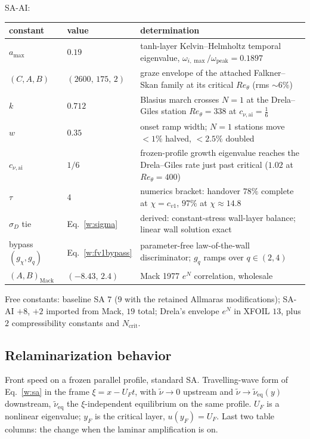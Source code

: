 \documentclass[10pt]{article}
\begin{document}
SA-AI:
\begin{table}[H]\centering\small
\begin{tabular}{llp{3.9in}}
\toprule
constant & value & determination \\
\midrule
$a_{\max}$ & $0.19$ & tanh-layer Kelvin--Helmholtz temporal eigenvalue, $\omega_{i,\max}/\omega_{\mathrm{peak}}=0.1897$ \\
$(C,A,B)$ & $(2600,\,175,\,2)$ & graze envelope of the attached Falkner--Skan family at its critical $Re_\theta$ (rms $\sim6\%$) \\
$k$ & $0.712$ & Blasius march crosses $N\!=\!1$ at the Drela--Giles station $Re_\theta=338$ at $c_{\nu,\mathrm{ai}}=\tfrac16$ \\
$w$ & $0.35$ & onset ramp width; $N\!=\!1$ stations move $<\!1\%$ halved, $<\!2.5\%$ doubled \\
$c_{\nu,\mathrm{ai}}$ & $1/6$ & frozen-profile growth eigenvalue reaches the Drela--Giles rate just past critical ($1.02$ at $Re_\theta\!=\!400$) \\
$\tau$ & $4$ & numerics bracket: handover $78\%$ complete at $\chi=c_{v1}$, $97\%$ at $\chi\approx14.8$ \\
$\sigma_D$ tie & Eq.~\eqref{w:sigma} & derived: constant-stress wall-layer balance; linear wall solution exact \\
bypass $(g_\chi,g_q)$ & Eq.~\eqref{w:fv1bypass} & parameter-free law-of-the-wall discriminator; $g_q$ ramps over $q\in(2,4)$ \\
$(A,B)_\mathrm{Mack}$ & $(-8.43,\,2.4)$ & Mack 1977 $e^N$ correlation, wholesale \\
\bottomrule
\end{tabular}
\end{table}

Free constants: baseline SA $7$ ($9$ with the retained Allmaras
modifications); SA-AI $+8$, $+2$ imported from Mack, $19$ total; Drela's
envelope $e^N$ in XFOIL $13$, plus $2$ compressibility constants and
$N_\mathrm{crit}$.

\subsection{Relaminarization behavior}

Front speed on a frozen parallel profile, standard SA.
Travelling-wave form of Eq.~\eqref{w:sa} in the frame $\xi=x-U_F t$, with
$\tilde\nu\to0$ upstream and $\tilde\nu\to\tilde\nu_\mathrm{eq}(y)$ downstream,
$\tilde\nu_\mathrm{eq}$ the $\xi$-independent equilibrium on the same profile.
$U_F$ is a nonlinear eigenvalue; $y_F$ is the critical layer, $u(y_F)=U_F$.
Last two table columns: the change when the laminar
amplification is on.
\end{document}
